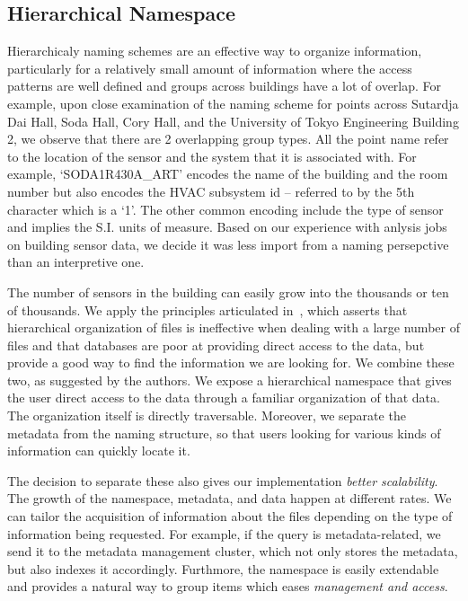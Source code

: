 
\subsection{Hierarchical Namespace}

Hierarchicaly naming schemes are an effective way to organize information, particularly for a relatively small amount of information
where the access patterns are well defined and groups across buildings have a lot of overlap.  For example, upon close examination of
the naming scheme for points across Sutardja Dai Hall, Soda Hall, Cory Hall, and the University of Tokyo Engineering Building 2, we 
observe that there are 2 overlapping group types.  All the point name refer to the location of the sensor and the system that it is 
associated with.  For example, `SODA1R430A\_ART' encodes the name of the building and the room number but also encodes the HVAC subsystem id --
referred to by the 5th character which is a `1'.  The other common encoding include the type of sensor and implies the S.I. units of measure.
Based on our experience with anlysis jobs on building sensor data, we decide it was less import from a naming persepctive than 
an interpretive one.

The number of sensors in the building can easily grow into the thousands or ten of thousands.  We apply the principles articulated 
in~\cite{hierarchy_is_dead}, which asserts that hierarchical organization of files is ineffective when dealing with a large number of files
and that databases are poor at providing direct access to the data, but provide a good way to find the information we are looking for.
We combine these two, as suggested by the authors.  We expose a hierarchical namespace that gives the user direct access to the data
through a familiar organization of that data.  The organization itself is directly traversable.  Moreover, we separate the metadata from
the naming structure, so that users looking for various kinds of information can quickly locate it.

The decision to separate these also gives our implementation \emph{better scalability}.  The growth of the namespace, metadata, and data
happen at different rates.  We can tailor the acquisition of information about the files depending on the type of information
being requested.  For example, if the query is metadata-related, we send it to the metadata management cluster, which not only stores
the metadata, but also indexes it accordingly.  Furthmore, the namespace is easily extendable and provides a natural
way to group items which eases \emph{management and access}.

